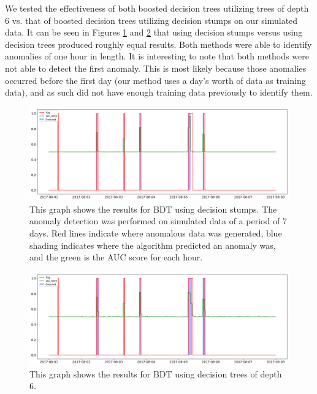 \documentclass[5p]{elsarticle}
\begin{document}
We tested the effectiveness of both boosted decision trees utilizing trees of depth 6 vs. that of boosted decision trees utilizing decision stumps on our simulated data. It can be seen in Figures \ref{fig:shaded} and \ref{fig:shaded-tree} that using decision stumps versus using decision trees produced roughly equal results. Both methods were able to identify anomalies of one hour in length. It is interesting to note that both methods were not able to detect the first anomaly. This is most likely because those anomalies occurred before the first day (our method uses a day’s worth of data as training data), and as such did not have enough training data previously to identify them. 

\begin{figure}[htbp]
    \centering
    \includegraphics[width=\linewidth]{shaded-stumps.png}
    \caption{This graph shows the results for BDT using decision stumps. The anomaly detection was performed on simulated data of a period of 7 days. Red lines indicate where anomalous data was generated, blue shading indicates where the algorithm predicted an anomaly was, and the green is the AUC score for each hour.}
    \label{fig:shaded}
\end{figure}

\begin{figure}[htbp]
    \centering
    \includegraphics[width=\linewidth]{shaded-tree.png}
    \caption{This graph shows the results for BDT using decision trees of depth 6.}
    \label{fig:shaded-tree}
\end{figure}
\end{document}
